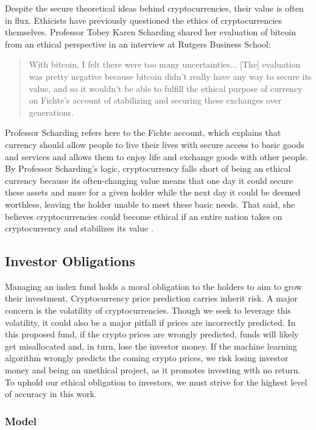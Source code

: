 \documentclass[10pt,twocolumn]{article}
\begin{document}
Despite the secure theoretical ideas behind cryptocurrencies, their value is often in flux. Ethicists have previously questioned the ethics of cryptocurrencies themselves. Professor Tobey Karen Scharding shared her evaluation of bitcoin from an ethical perspective in an interview at Rutgers Business School:

\begin{quote}
    With bitcoin, I felt there were too many uncertainties... [The] evaluation was pretty negative because bitcoin didn't really have any way to secure its value, and so it wouldn't be able to fulfill the ethical purpose of currency on Fichte's account of stabilizing and securing these exchanges over generations. \cite{IsBitcoinEthical}
\end{quote}

Professor Scharding refers here to the Fichte account, which explains that currency should allow people to live their lives with secure access to basic goods and services and allows them to enjoy life and exchange goods with other people. By Professor Scharding's logic, cryptocurrency falls short of being an ethical currency because its often-changing value means that one day it could secure these assets and more for a given holder while the next day it could be deemed worthless, leaving the holder unable to meet these basic needs. That said, she believes cryptocurrencies could become ethical if an entire nation takes on cryptocurrency and stabilizes its value \cite{IsBitcoinEthical}.

\subsection{Investor Obligations}

Managing an index fund holds a moral obligation to the holders to aim to grow their investment. Cryptocurrency price prediction carries inherit risk. A major concern is the volatility of cryptocurrencies. Though we seek to leverage this volatility, it could also be a major pitfall if prices are incorrectly predicted. In this proposed fund, if the crypto prices are wrongly predicted, funds will likely get misallocated and, in turn, lose the investor money. If the machine learning algorithm wrongly predicts the coming crypto prices, we risk losing investor money and being an unethical project, as it promotes investing with no return. To uphold our ethical obligation to investors, we must strive for the highest level of accuracy in this work.

\subsubsection{Model}
\end{document}
